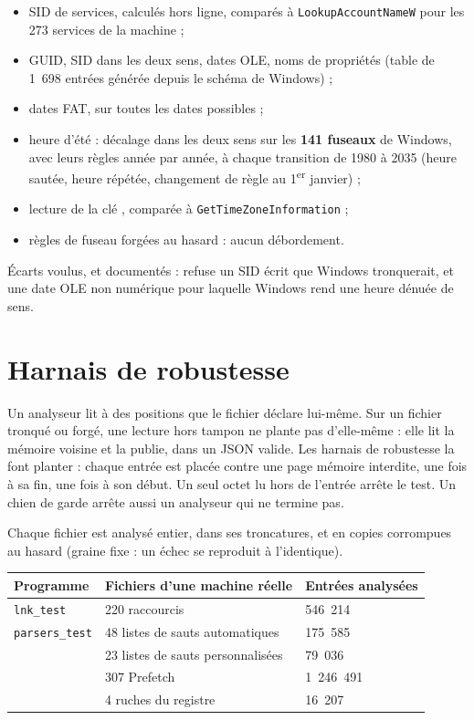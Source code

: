 \documentclass[11pt,a4paper,oneside]{report}
\begin{document}
\begin{itemize}
  \item SID de services, calculés hors ligne, comparés à
    \texttt{LookupAccountNameW} pour les 273 services de la machine ;
  \item GUID, SID dans les deux sens, dates OLE, noms de propriétés (table de
    1~698 entrées générée depuis le schéma de Windows) ;
  \item dates FAT, sur toutes les dates possibles ;
  \item heure d'été : décalage dans les deux sens sur les \textbf{141 fuseaux}
    de Windows, avec leurs règles année par année, à chaque transition de 1980
    à 2035 (heure sautée, heure répétée, changement de règle au 1\textsuperscript{er}
    janvier) ;
  \item lecture de la clé , comparée à
    \texttt{GetTimeZoneInformation} ;
  \item règles de fuseau forgées au hasard : aucun débordement.
\end{itemize}

Écarts voulus, et documentés : \wac{} refuse un SID écrit que Windows
tronquerait, et une date OLE non numérique pour laquelle Windows rend une heure
dénuée de sens.

\section{Harnais de robustesse}

Un analyseur lit à des positions que le fichier déclare lui-même. Sur un
fichier tronqué ou forgé, une lecture hors tampon ne plante pas d'elle-même :
elle lit la mémoire voisine et la publie, dans un JSON valide. Les harnais de
robustesse la font planter : chaque entrée est placée contre une page mémoire
interdite, une fois à sa fin, une fois à son début. Un seul octet lu hors de
l'entrée arrête le test. Un chien de garde arrête aussi un analyseur qui ne
termine pas.

Chaque fichier est analysé entier, dans ses troncatures, et en copies
corrompues au hasard (graine fixe : un échec se reproduit à l'identique).

\begin{longtable}{@{}L{4.2cm}L{6.4cm}L{4.4cm}@{}}
\toprule
\textbf{Programme} & \textbf{Fichiers d'une machine réelle} & \textbf{Entrées analysées} \\
\midrule
\endhead
\texttt{lnk\_test} & 220 raccourcis & 546~214 \\
\texttt{parsers\_test} & 48 listes de sauts automatiques & 175~585 \\
 & 23 listes de sauts personnalisées & 79~036 \\
 & 307 Prefetch & 1~246~491 \\
 & 4 ruches du registre & 16~207 \\
\bottomrule
\end{longtable}
\end{document}
